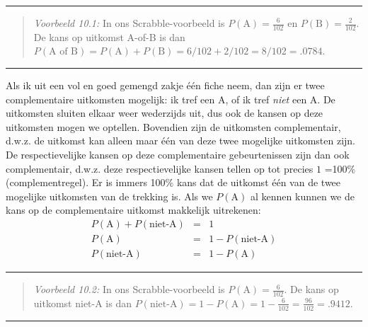 \documentclass[
]{book}
\begin{document}
\begin{center}\rule{0.5\linewidth}{0.5pt}\end{center}

\begin{quote}
\emph{Voorbeeld 10.1:}
In ons Scrabble-voorbeeld is \(P(\textrm{A})=\frac{6}{102}\) en
\(P(\textrm{B})=\frac{2}{102}\). De kans op uitkomst A-of-B is dan
\(P(\textrm{A of B})=P(\textrm{A})+P(\textrm{B})=6/102+2/102=8/102=.0784\).
\end{quote}

\begin{center}\rule{0.5\linewidth}{0.5pt}\end{center}

Als ik uit een vol en goed gemengd zakje één fiche neem, dan zijn er
twee complementaire uitkomsten mogelijk: ik tref een A, of ik tref
\emph{niet} een A. De uitkomsten sluiten elkaar weer wederzijds uit, dus ook
de kansen op deze uitkomsten mogen we optellen. Bovendien zijn de
uitkomsten complementair, d.w.z. de uitkomst kan alleen maar één van
deze twee mogelijke uitkomsten zijn. De respectievelijke kansen op deze
complementaire gebeurtenissen zijn dan ook complementair, d.w.z. deze
respectievelijke kansen tellen op tot precies \(1\) =100\%
(complementregel). Er is immers 100\% kans dat de uitkomst één van de
twee mogelijke uitkomsten van de trekking is. Als we \(P(\textrm{A})\) al
kennen kunnen we de kans op de complementaire uitkomst makkelijk
uitrekenen:
\begin{align}
    P(\textrm{A}) + P(\textrm{niet-A}) & = & 1\\
    P(\textrm{A}) & = & 1 - P(\textrm{niet-A})\\
    P(\textrm{niet-A}) & = & 1 - P(\textrm{A})
    \label{eq:complementregel}
\end{align}

\begin{center}\rule{0.5\linewidth}{0.5pt}\end{center}

\begin{quote}
\emph{Voorbeeld 10.2:}
In ons Scrabble-voorbeeld is \(P(\textrm{A})=\frac{6}{102}\). De kans op
uitkomst niet-A is dan
\(P(\textrm{niet-A})= 1 - P(\textrm{A}) = 1 - \frac{6}{102} = \frac{96}{102} = .9412\).
\end{quote}

\begin{center}\rule{0.5\linewidth}{0.5pt}\end{center}
\end{document}
